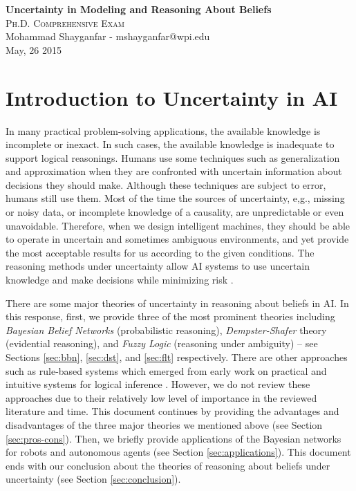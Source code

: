 \documentclass[11pt]{article}
\begin{document}

\begin{center}
{\LARGE{\textbf{Uncertainty in Modeling and Reasoning About Beliefs}}} \\
\Large\textsc{Ph.D. Comprehensive Exam} \\[1em]
\large\textnormal{Mohammad Shayganfar - mshayganfar@wpi.edu} \\
\large\textnormal{May, 26 2015}
\end{center}

\section{Introduction to Uncertainty in AI}

In many practical problem-solving applications, the available knowledge is
incomplete or inexact. In such cases, the available knowledge is inadequate to
support logical reasonings. Humans use some techniques such as generalization
and approximation when they are confronted with uncertain information about 
decisions they should make. Although these techniques are subject to error,
humans still use them. Most of the time the sources of uncertainty, e,g.,
missing or noisy data, or incomplete knowledge of a causality, are unpredictable
or even unavoidable. Therefore, when we design intelligent machines, they
should be able to operate in uncertain and sometimes ambiguous environments, and
yet provide the most acceptable results for us according to the given
conditions. The reasoning methods under uncertainty allow AI systems to use
uncertain knowledge and make decisions while minimizing risk
\cite{tanimoto:ai-lisp}.

There are some major theories of uncertainty in reasoning about beliefs in AI.
In this response, first, we provide three of the most prominent theories
including \textit{Bayesian Belief Networks} (probabilistic reasoning),
\textit{Dempster-Shafer} theory (evidential reasoning), and \textit{Fuzzy Logic}
(reasoning under ambiguity) -- see Sections \ref{sec:bbn}, \ref{sec:dst}, and
\ref{sec:flt} respectively. There are other approaches such as rule-based
systems which emerged from early work on practical and intuitive systems for
logical inference \cite{russell:ai-modern}. However, we do not review these
approaches due to their relatively low level of importance in the reviewed
literature and time. This document continues by providing the advantages and
disadvantages of the three major theories we mentioned above (see Section
\ref{sec:pros-cons}). Then, we briefly provide applications of the Bayesian
networks for robots and autonomous agents (see Section \ref{sec:applications}).
This document ends with our conclusion about the theories of reasoning about
beliefs under uncertainty (see Section \ref{sec:conclusion}).
\end{document}

